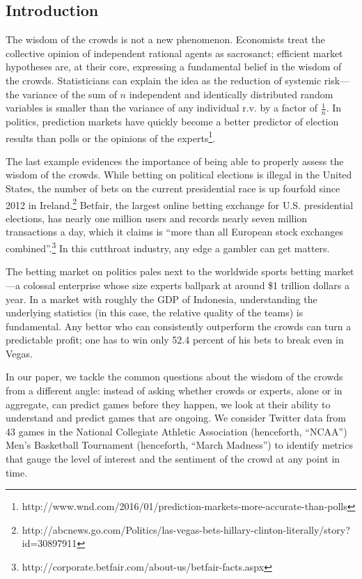 \documentclass[12pt]{article}
\begin{document}
\tableofcontents
\newpage
\begin{doublespacing}

\section{Introduction}

The wisdom of the crowds is not a new phenomenon. Economists treat the collective opinion of independent rational agents as sacrosanct; efficient market hypotheses are, at their core, expressing a fundamental belief in the wisdom of the crowds. Statisticians can explain the idea as the reduction of systemic risk---the variance of the sum of $n$ independent and identically distributed random variables is smaller than the variance of any individual r.v. by a factor of $\frac{1}{n}$. In politics, prediction markets have quickly become a better predictor of election results than polls or the opinions of the experts\footnote{http://www.wnd.com/2016/01/prediction-markets-more-accurate-than-polls}.

The last example evidences the importance of being able to properly assess the wisdom of the crowds. While betting on political elections is illegal in the United States, the number of bets on the current presidential race is up fourfold since 2012 in Ireland.\footnote{http://abcnews.go.com/Politics/las-vegas-bets-hillary-clinton-literally/story?id=30897911} Betfair, the largest online betting exchange for U.S. presidential elections, has nearly one million users and records nearly seven million transactions a day, which it claims is ``more than all European stock exchanges combined''.\footnote{http://corporate.betfair.com/about-us/betfair-facts.aspx} In this cutthroat industry, any edge a gambler can get matters. 

The betting market on politics pales next to the worldwide sports betting market---a colossal enterprise whose size experts ballpark at around \$1 trillion dollars a year. In a market with roughly the GDP of Indonesia, understanding the underlying statistics (in this case, the relative quality of the teams) is fundamental. Any bettor who can consistently outperform the crowds can turn a predictable profit; one has to win only 52.4 percent of his bets to break even in Vegas. 

In our paper, we tackle the common questions about the wisdom of the crowds from a different angle: instead of asking whether crowds or experts, alone or in aggregate, can predict games before they happen, we look at their ability to understand and predict games that are ongoing. We consider Twitter data from 43 games in the National Collegiate Athletic Association (henceforth, ``NCAA'') Men's Basketball Tournament (henceforth, ``March Madness'') to identify metrics that gauge the level of interest and the sentiment of the crowd at any point in time. 


\end{doublespacing}
\end{document}
